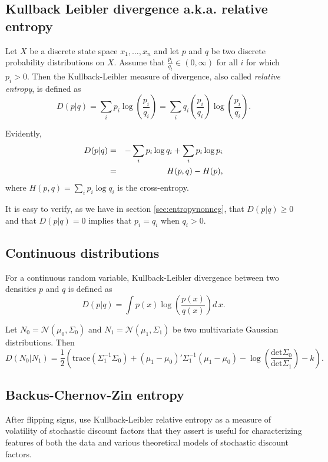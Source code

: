 \begin{subappendices}
\subsection{Kullback Leibler divergence a.k.a. relative entropy}

Let $X$ be a discrete state space $x_1, \ldots, x_n$ and let $p$ and $q$ be  two discrete probability
distributions on $X$.  Assume that $\frac{p_i}{q_t} \in (0,\infty)$ for all $i$ for which $p_i >0$.
Then the Kullback-Leibler measure of divergence, also called {\em relative entropy},
is defined as
\begin{equation}\label{Shannon3}
D(p|q) = \sum_i p_i \log \left(\frac{p_i}{q_i}\right) = \sum_i q_i \left( \frac{p_i}{q_i}\right) \log\left( \frac{p_i}{q_i}\right) .
\end{equation}

Evidently,
\begin{eqnarray}
D(p|q) &=& - \sum_i p_i \log q_i + \sum_i p_i \log p_i \cr
  & = & H(p,q) - H(p)   ,\end{eqnarray}
where $H(p,q) = \sum_i p_i \log   q_i$ is the cross-entropy.

It is easy to verify, as we have in section \ref{sec:entropynonneg}, that $
D(p|q) \geq 0$ and that $D(p|q) = 0$ implies that $p_i = q_i$ when $q_i >0$.

\subsection{Continuous distributions}

For a continuous random variable, Kullback-Leibler divergence between two densities $p$ and $q$ is defined as
\[D(p|q) = \int p(x) \log \left(\frac{p(x)}{q(x)} \right) d \, x .\]

\begin{example}\label{KL_Gaussian_example}
Let  $N_0 = {\mathcal N}(\mu_0,\Sigma_0)$ and $N_1={\mathcal N}(\mu_1, \Sigma_1)$ be two multivariate Gaussian
distributions. Then
\begin{equation}\label{Shannon5}
D(N_0|N_1) = \frac{1}{2} \left(\mathrm {trace} (\Sigma_1^{-1} \Sigma_0)
+ (\mu_1 -\mu_0)' \Sigma_1^{-1} (\mu_1 - \mu_0) - \log\left( \frac{ \mathrm {det }\Sigma_0 }{\mathrm {det}\Sigma_1}\right)
   - k \right).
\end{equation}
\end{example}


\subsection{Backus-Chernov-Zin entropy}
After flipping signs, \citet{BCZ2012} use Kullback-Leibler relative entropy as a measure of volatility of stochastic discount factors that they
assert is useful for characterizing features of both the data and various theoretical models of stochastic discount factors.


\end{subappendices}
